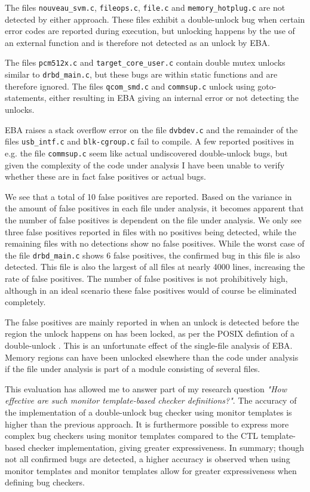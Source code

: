 \newpar The files \texttt{nouveau\_svm.c}, \texttt{fileops.c}, \texttt{file.c} and \texttt{memory\_hotplug.c} are not detected by either approach. These files exhibit a double-unlock bug when certain error codes are reported during execution, but unlocking happens by the use of an external function and is therefore not detected as an unlock by EBA.

\newpar The files \texttt{pcm512x.c} and \texttt{target\_core\_user.c} contain double mutex unlocks similar to \texttt{drbd\_main.c}, but these bugs are within static functions and are therefore ignored. The files \texttt{qcom\_smd.c} and \texttt{commsup.c} unlock using goto-statements, either resulting in EBA giving an internal error or not detecting the unlocks. 

\newpar EBA raises a stack overflow error on the file \texttt{dvbdev.c} and the remainder of the files \texttt{usb\_intf.c} and \texttt{blk-cgroup.c} fail to compile. A few reported positives in e.g. the file \texttt{commsup.c} seem like actual undiscovered double-unlock bugs, but given the complexity of the code under analysis I have been unable to verify whether these are in fact false positives or actual bugs. 

\newpar We see that a total of 10 false positives are reported. Based on the variance in the amount of false positives in each file under analysis, it becomes apparent that the number of false positives is dependent on the file under analysis. We only see three false positives reported in files with no positives being detected, while the remaining files with no detections show no false positives. While the worst case of the file \texttt{drbd\_main.c} shows 6 false positives, the confirmed bug in this file is also detected. This file is also the largest of all files at nearly 4000 lines, increasing the rate of false positives. The number of false positives is not prohibitively high, although in an ideal scenario these false positives would of course be eliminated completely. 

\newpar The false positives are mainly reported in when an unlock is detected before the region the unlock happens on has been locked, as per the POSIX defintion of a double-unlock \cite{unlockPOSIX}. This is an unfortunate effect of the single-file analysis of EBA. Memory regions can have been unlocked elsewhere than the code under analysis if the file under analysis is part of a module consisting of several files. 

\newpar This evaluation has allowed me to answer part of my research question \textit{"How effective are such monitor template-based checker definitions?"}. The accuracy of the implementation of a double-unlock bug checker using monitor templates is higher than the previous approach. It is furthermore possible to express more complex bug checkers using monitor templates compared to the CTL template-based checker implementation, giving greater expressiveness. In summary; though not all confirmed bugs are detected, a higher accuracy is observed when using monitor templates and monitor templates allow for greater expressiveness when defining bug checkers. 